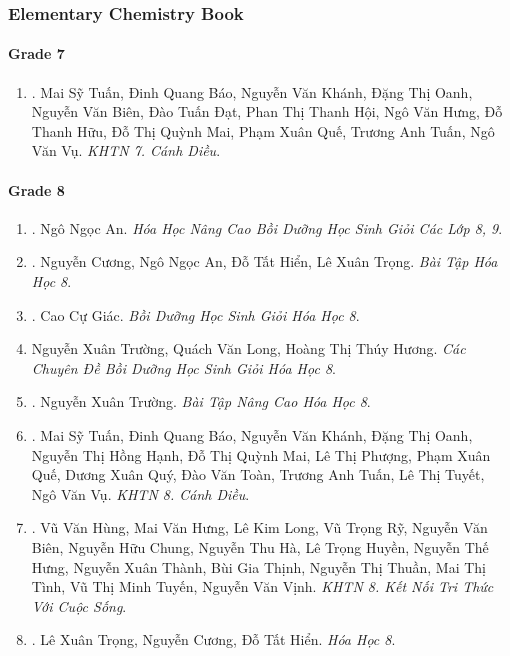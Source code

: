 \documentclass{article}
\begin{document}
\subsubsection{Elementary Chemistry Book}

\paragraph{Grade 7}

\begin{enumerate}
	\item \cite{SGK_KHTN_7_CD}. Mai Sỹ Tuấn, Đinh Quang Báo, Nguyễn Văn Khánh, Đặng Thị Oanh, Nguyễn Văn Biên, Đào Tuấn Đạt, Phan Thị Thanh Hội, Ngô Văn Hưng, Đỗ Thanh Hữu, Đỗ Thị Quỳnh Mai, Phạm Xuân Quế, Trương Anh Tuấn, Ngô Văn Vụ. {\it KHTN 7. Cánh Diều}.\hfill{\sf[reading]}
\end{enumerate}

\paragraph{Grade 8}

\begin{enumerate}
	\item \cite{An_Hoa_Hoc_nang_cao_8_9}. Ngô Ngọc An. {\it Hóa Học Nâng Cao Bồi Dưỡng Học Sinh Giỏi Các Lớp 8, 9}.\hfill{\sf[done]}

	\item \cite{SBT_Hoa_Hoc_8}. Nguyễn Cương, Ngô Ngọc An, Đỗ Tất Hiển, Lê Xuân Trọng. {\it Bài Tập Hóa Học 8}.\hfill{\sf[reading]}

	\item \cite{Giac2021}. Cao Cự Giác. {\it Bồi Dưỡng Học Sinh Giỏi Hóa Học 8}.\hfill{\sf[reading]}

	\item Nguyễn Xuân Trường, Quách Văn Long, Hoàng Thị Thúy Hương. {\it Các Chuyên Đề Bồi Dưỡng Học Sinh Giỏi Hóa Học 8}.

	\item \cite{Truong_BTNC_Hoa_Hoc_8_2022}. Nguyễn Xuân Trường. {\it Bài Tập Nâng Cao Hóa Học 8}.\hfill{\sf[reading]}

	\item \cite{SGK_KHTN_8_CD}. Mai Sỹ Tuấn, Đinh Quang Báo, Nguyễn Văn Khánh, Đặng Thị Oanh, Nguyễn Thị Hồng Hạnh, Đỗ Thị Quỳnh Mai, Lê Thị Phượng, Phạm Xuân Quế, Dương Xuân Quý, Đào Văn Toàn, Trương Anh Tuấn, Lê Thị Tuyết, Ngô Văn Vụ. {\it KHTN 8. Cánh Diều}.\hfill{\sf[reading]}

	\item \cite{SGK_KHTN_8_KNTTVCS}. Vũ Văn Hùng, Mai Văn Hưng, Lê Kim Long, Vũ Trọng Rỹ, Nguyễn Văn Biên, Nguyễn Hữu Chung, Nguyễn Thu Hà, Lê Trọng Huyền, Nguyễn Thế Hưng, Nguyễn Xuân Thành, Bùi Gia Thịnh, Nguyễn Thị Thuần, Mai Thị Tình, Vũ Thị Minh Tuyến, Nguyễn Văn Vịnh. {\it KHTN 8. Kết Nối Tri Thức Với Cuộc Sống}.\hfill{\sf[reading]}

	\item \cite{SGK_Hoa_Hoc_8}. Lê Xuân Trọng, Nguyễn Cương, Đỗ Tất Hiển. {\it Hóa Học 8}.\hfill{\sf[reading]}
\end{enumerate}
\end{document}
